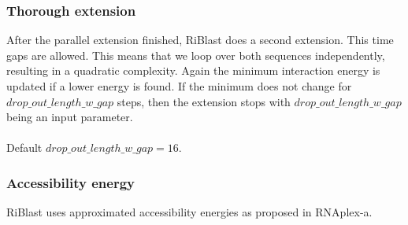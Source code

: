 \subsubsection{Thorough extension}

After the parallel extension finished, RiBlast does a second extension. This time gaps are allowed. This means that we loop over both sequences independently, resulting in a quadratic complexity. Again the minimum interaction energy is updated if a lower energy is found. If the minimum does not change for $drop\_out\_length\_w\_gap$ steps, then the extension stops with $drop\_out\_length\_w\_gap$ being an input parameter.
\\\\
Default $drop\_out\_length\_w\_gap = 16$.

\subsubsection{Accessibility energy}

RiBlast uses approximated accessibility energies as proposed in RNAplex-a.
